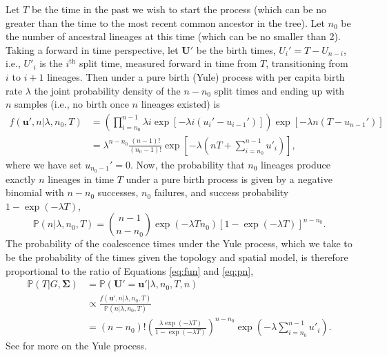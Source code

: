 \documentclass[12pt]{article}
\begin{document}
Let $T$ be the time in the past we wish to start the process (which can be no greater than the time to the most recent common ancestor in the tree).
Let $n_0$ be the number of ancestral lineages at this time (which can be no smaller than 2).
Taking a forward in time perspective, let $\mathbf{U}'$ be the birth times, $U_i' = T - U_{n - i}$, i.e., $U'_i$ is the $i^\mathrm{th}$ split time, measured forward in time from $T$, transitioning from $i$ to $i+1$ lineages. 
Then under a pure birth (Yule) process with per capita birth rate $\lambda$ the joint probability density of the $n-n_0$ split times and ending up with $n$ samples (i.e., no birth once $n$ lineages existed) is 
%
\begin{equation}\label{eq:fun}
\begin{aligned}
f(\mathbf{u}', n | \lambda, n_0, T) &=  \left( \prod_{i=n_0}^{n-1} \lambda i \exp[-\lambda i (u_i' - u_{i-1}')] \right)   \exp[-\lambda n (T - u_{n-1}')] \\
& = \lambda^{n-n_0} \frac{(n-1)!}{(n_0-1)!} \exp \left[-\lambda \left( n T + \sum_{i=n_0}^{n-1}u'_i \right) \right],
\end{aligned}
\end{equation}
%
where we have set $u_{n_0-1}' = 0$. 
Now, the probability that $n_0$ lineages produce exactly $n$ lineages in time $T$ under a pure birth process is given by a negative binomial with $n-n_0$ successes, $n_0$ failures, and success probability $1 - \exp(-\lambda T)$,
%
\begin{equation}\label{eq:pn}
\mathbb{P}(n|\lambda,n_0,T) = \binom{n-1}{n-n_0} \exp(-\lambda T n_0) [1-\exp(-\lambda T)]^{n-n_0}.
\end{equation}
%
The probability of the coalescence times under the Yule process, which we take to be the probability of the times given the topology and spatial model, is therefore proportional to the ratio of Equations \eqref{eq:fun} and \eqref{eq:pn},
%
\begin{equation}\label{eq:pTSigma}
\begin{aligned}
\mathbb{P}(T | G, \mathbf{\Sigma}) &= \mathbb{P}(\mathbf{U'} = \mathbf{u'} | \lambda,n_0,T,n) \\
& \propto \frac{f(\mathbf{u}', n | \lambda, n_0, T)}{\mathbb{P}(n|\lambda,n_0,T)} \\
& = (n-n_0)! \left(\frac{\lambda \exp(-\lambda T)}{1-\exp(-\lambda T)}\right)^{n-n_0} \exp\left(-\lambda \sum_{i=n_0}^{n-1}u'_i \right).
\end{aligned}
\end{equation}
See \cite{edwards1970estimation,rannala1996probability,meligkotsidou2007postprocessing} for more on the Yule process.
\end{document}
